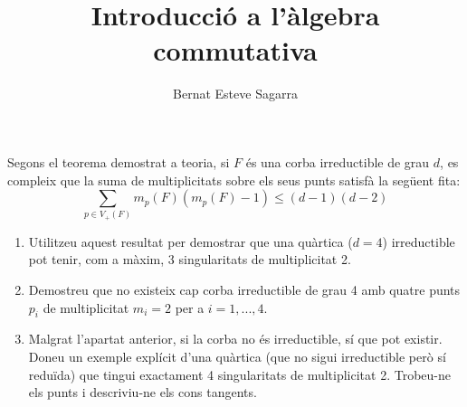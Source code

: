 \documentclass[11pt, a4paper]{article}
\title{Introducció a l'àlgebra commutativa}
\author{Bernat Esteve Sagarra}
\begin{document}
\pagestyle{fancy}
% 
\begin{tcolorbox}[title=\section{Exercici 1}]
Segons el teorema demostrat a teoria, si $F$ és una corba irreductible de grau $d$, es compleix que la suma de multiplicitats sobre els seus punts satisfà la següent fita:
\[\sum_{p \in V_+(F)} m_p(F)(m_p(F)-1) \le (d-1)(d-2)\]
\begin{enumerate}
    \item Utilitzeu aquest resultat per demostrar que una quàrtica ($d=4$) irreductible pot tenir, com a màxim, 3 singularitats de multiplicitat 2.
    \item Demostreu que no existeix cap corba irreductible de grau 4 amb quatre punts $p_i$ de multiplicitat $m_i=2$ per a $i=1,...,4$.
    \item Malgrat l'apartat anterior, si la corba no és irreductible, sí que pot existir. Doneu un exemple explícit d'una quàrtica (que no sigui irreductible però sí reduïda) que tingui exactament 4 singularitats de multiplicitat 2. Trobeu-ne els punts i descriviu-ne els cons tangents.
\end{enumerate}
\end{tcolorbox}
\end{document}
